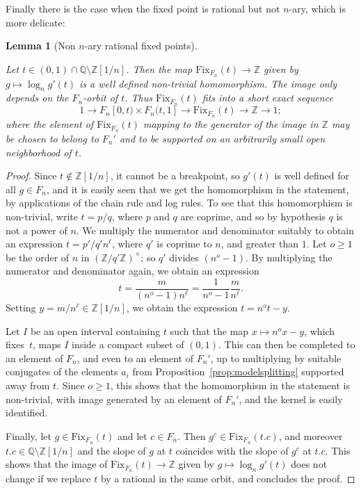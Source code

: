 \documentclass[10pt,a4paper]{article}
\newtheorem{lemm}[cdrthm]{Lemma}
\theoremstyle{definition}
\theoremstyle{remark}
\newcommand{\Z}{\mathbb{Z}}
\newcommand{\Q}{\mathbb{Q}}
\newcommand{\Fix}{\mathrm{Fix}}
\theoremstyle{plain}
\begin{document}
Finally there is the case when the fixed point is rational but not $n$-ary, which is more delicate:

\begin{lemm}[Non $n$-ary rational fixed points]
\label{lem:fix:rational}

Let $t \in (0, 1) \cap \Q \setminus \Z[1/n]$. Then the map $\Fix_{F_n}(t) \to \Z$ given by $g \mapsto \log_n g'(t)$ is a well defined non-trivial homomorphism. The image only depends on the $F_n$-orbit of $t$. Thus $\Fix_{F_n}(t)$ fits into a short exact sequence
\[1 \to F_n[0, t) \times F_n(t, 1] \to \Fix_{F_n}(t) \to \Z \to 1;\]
where the element of $\Fix_{F_n}(t)$ mapping to the generator of the image in $\Z$ may be chosen to belong to $F_n'$ and to be supported on an arbitrarily small open neighborhood of $t$.
\end{lemm}

\begin{proof}
Since $t \notin \Z[1/n]$, it cannot be a breakpoint, so $g'(t)$ is well defined for all $g \in F_n$, and it is easily seen that we get the homomorphism in the statement, by applications of the chain rule and log rules.
To see that this homomorphism is non-trivial, write $t = p/q$, where $p$ and $q$ are coprime, and so by hypothesis $q$ is not a power of $n$. We multiply the numerator and denominator suitably to obtain an expression $t = p'/q' n^\ell$, where $q'$ is coprime to $n$, and greater than $1$. Let $o\ge 1$ be the order of $n$ in $(\Z/q'\Z)^\times$; so $q'$ divides $(n^o - 1)$. By multiplying the numerator and denominator again, we obtain an expression
\[
t = \frac{m}{(n^o - 1) n^\ell} = \frac{1}{n^o-1} \frac{m}{n^\ell}\text{.}
\]
Setting $y = m/n^\ell \in \Z[1/n]$, we obtain the expression $t = n^o t - y$.

Let $I$ be an open interval containing $t$ such that the map $x \mapsto n^o x - y$, which fixes~$t$, maps $I$ inside a compact subset of $(0, 1)$. This can then be completed to an element of $F_n$, and even to an element of $F_n'$, up to multiplying by suitable conjugates of the elements $a_i$ from Proposition~\ref{prop:modelsplitting} supported away from $t$. Since $o \ge 1$, this shows that the homomorphism in the statement is non-trivial, with image generated by an element of $F_n'$, and the kernel is easily identified.

Finally, let $g \in \Fix_{F_n}(t)$ and let $c \in F_n$. Then $g^c \in \Fix_{F_n}(t.c)$, and moreover $t.c \in \Q \setminus \Z[1/n]$ and the slope of $g$ at $t$ coincides with the slope of $g^c$ at $t.c$. This shows that the image of $\Fix_{F_n}(t) \to \Z$ given by $g \mapsto \log_n g'(t)$ does not change if we replace $t$ by a rational in the same orbit, and concludes the proof.
\end{proof}
\end{document}
